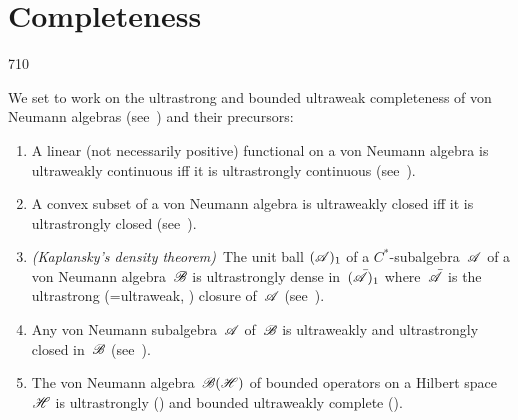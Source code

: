 \section{Completeness}
\begin{parsec}{710}%
\begin{point}{10}%
We set to work on the ultrastrong and bounded ultraweak completeness
of von Neumann algebras (see~) and their precursors:
\begin{enumerate}
\item
A linear (not necessarily positive)
functional on a von Neumann algebra
is ultraweakly continuous iff it is ultrastrongly continuous
(see~).
\item
A convex subset of a von Neumann algebra
is ultraweakly closed iff it is ultrastrongly closed
(see~).
\item
\emph{(Kaplansky's density theorem)}\ 
The unit ball $(\mathscr{A})_1$
of a $C^*$-subalgebra~$\mathscr{A}$
of a von Neumann algebra~$\mathscr{B}$
is ultrastrongly dense in~$(\bar{\mathscr{A}})_1$
where~$\bar{\mathscr{A}}$ is the ultrastrong (=ultraweak,
) closure of~$\mathscr{A}$
(see~).
\item
Any von Neumann subalgebra~$\mathscr{A}$
of~$\mathscr{B}$ is ultraweakly and ultrastrongly
closed in~$\mathscr{B}$
(see~).
\item
The von Neumann algebra~$\mathscr{B}(\mathscr{H})$ 
of bounded operators on a Hilbert space~$\mathscr{H}$
is ultrastrongly 
()
and bounded ultraweakly complete
().
\end{enumerate}
\spacingfix%
\end{point}%
\end{parsec}%
